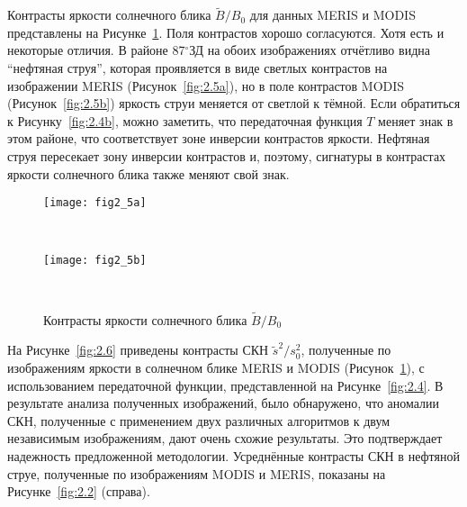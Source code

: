 Контрасты яркости солнечного блика $\tilde{B}/B_{0}$ для данных MERIS и MODIS представлены на Рисунке~\ref{fig:2.5}. Поля контрастов хорошо согласуются. Хотя есть и некоторые отличия. В районе 87${}^\circ$ЗД на обоих изображениях отчётливо видна ``нефтяная струя'', которая проявляется в виде светлых контрастов на изображении MERIS (Рисунок~\ref{fig:2.5a}), но в поле контрастов MODIS (Рисунок~\ref{fig:2.5b}) яркость струи меняется от светлой к тёмной. Если обратиться к Рисунку~\ref{fig:2.4b}, можно заметить, что передаточная функция $T$ меняет знак в этом районе, что соответствует зоне инверсии контрастов яркости. Нефтяная струя пересекает зону инверсии контрастов и, поэтому, сигнатуры в контрастах яркости солнечного блика также меняют свой знак.



\begin{figure}[H]
   	\centering
	\begin{minipage}{.97\textwidth}
	    \subcaptionbox{\label{fig:2.5a}}
		{\texttt{[image: fig2\_5a]}}
	\end{minipage}
	\hfill
	\\
	\begin{minipage}{.97\textwidth}
	    \subcaptionbox{\label{fig:2.5b}}
		{\texttt{[image: fig2\_5b]}}
	\end{minipage}
    \\
    \caption{Контрасты яркости солнечного блика $\tilde{B}/B_{0}$}
    \label{fig:2.5}
\end{figure}


На Рисунке~\ref{fig:2.6} приведены контрасты СКН $\tilde{s}^{2} /s_{0}^{2}$, полученные по изображениям яркости в солнечном блике MERIS и MODIS (Рисунок~\ref{fig:2.5}), с использованием передаточной функции, представленной на Рисунке~\ref{fig:2.4}. В результате анализа полученных изображений, было обнаружено, что аномалии СКН, полученные с применением двух различных алгоритмов к двум независимым изображениям, дают очень схожие результаты. Это подтверждает надежность предложенной методологии. Усреднённые контрасты СКН в нефтяной струе, полученные по изображениям MODIS и MERIS, показаны на Рисунке~\ref{fig:2.2} (справа).

